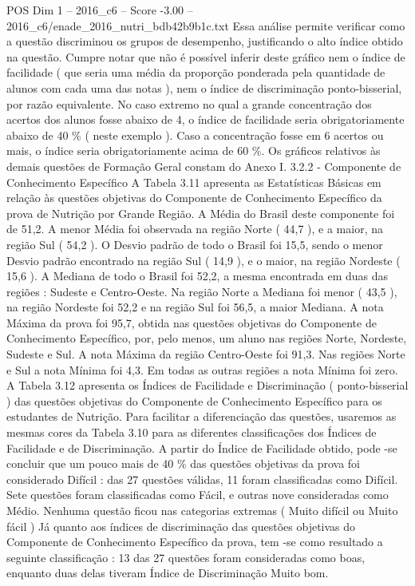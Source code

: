 \begin{textsample}{POS Dim 1 – 2016\_c6 – Score -3.00 – 2016\_c6/enade\_2016\_nutri\_bdb42b9b1c.txt}
Essa análise permite verificar como a questão discriminou os grupos de desempenho, justificando o alto índice obtido na questão.
Cumpre notar que não é possível inferir deste gráfico nem o índice de facilidade ( que seria uma média da proporção ponderada pela quantidade de alunos com cada uma das notas ), nem o índice de discriminação ponto-bisserial, por razão equivalente.
No caso extremo no qual a grande concentração dos acertos dos alunos fosse abaixo de 4, o índice de facilidade seria obrigatoriamente abaixo de 40 \% ( neste exemplo ).
Caso a concentração fosse em 6 acertos ou mais, o índice seria obrigatoriamente acima de 60 \%.
Os gráficos relativos às demais questões de Formação Geral constam do Anexo I. 3.2.2 - Componente de Conhecimento Específico A Tabela 3.11 apresenta as Estatísticas Básicas em relação às questões objetivas do Componente de Conhecimento Específico da prova de Nutrição por Grande Região.
A Média do Brasil deste componente foi de 51,2.
A menor Média foi observada na região Norte ( 44,7 ), e a maior, na região Sul ( 54,2 ).
O Desvio padrão de todo o Brasil foi 15,5, sendo o menor Desvio padrão encontrado na região Sul ( 14,9 ), e o maior, na região Nordeste ( 15,6 ).
A Mediana de todo o Brasil foi 52,2, a mesma encontrada em duas das regiões : Sudeste e Centro-Oeste.
Na região Norte a Mediana foi menor ( 43,5 ), na região Nordeste foi 52,2 e na região Sul foi 56,5, a maior Mediana.
A nota Máxima da prova foi 95,7, obtida nas questões objetivas do Componente de Conhecimento Específico, por, pelo menos, um aluno nas regiões Norte, Nordeste, Sudeste e Sul.
A nota Máxima da região Centro-Oeste foi 91,3.
Nas regiões Norte e Sul a nota Mínima foi 4,3.
Em todas as outras regiões a nota Mínima foi zero.
A Tabela 3.12 apresenta os Índices de Facilidade e Discriminação ( ponto-bisserial ) das questões objetivas do Componente de Conhecimento Específico para os estudantes de Nutrição.
Para facilitar a diferenciação das questões, usaremos as mesmas cores da Tabela 3.10 para as diferentes classificações dos Índices de Facilidade e de Discriminação.
A partir do Índice de Facilidade obtido, pode -se concluir que um pouco mais de 40 \% das questões objetivas da prova foi considerado Difícil : das 27 questões válidas, 11 foram classificadas como Difícil.
Sete questões foram classificadas como Fácil, e outras nove consideradas como Médio.
Nenhuma questão ficou nas categorias extremas ( Muito difícil ou Muito fácil ) Já quanto aos índices de discriminação das questões objetivas do Componente de Conhecimento Específico da prova, tem -se como resultado a seguinte classificação : 13 das 27 questões foram consideradas como boas, enquanto duas delas tiveram Índice de Discriminação Muito bom.

\end{textsample}
